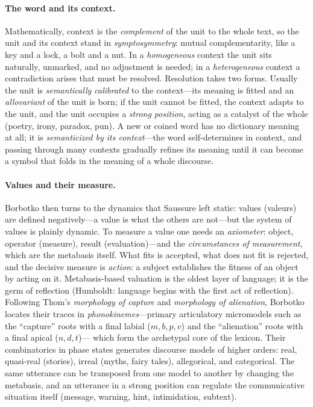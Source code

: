 \documentclass[11pt,a4paper]{article}
\theoremstyle{remark}
\begin{document}
\paragraph{The word and its context.}
Mathematically, context is the \emph{complement} of the unit to the whole
text, so the unit and its context stand in \emph{symptosymmetry}: mutual
complementarity, like a key and a lock, a bolt and a nut. In a
\emph{homogeneous} context the unit sits naturally, unmarked, and no
adjustment is needed; in a \emph{heterogeneous} context a contradiction arises
that must be resolved. Resolution takes two forms. Usually the unit is
\emph{semantically calibrated} to the context---its meaning is fitted and an
\emph{allovariant} of the unit is born; if the unit cannot be fitted, the
context adapts to the unit, and the unit occupies a \emph{strong position},
acting as a catalyst of the whole (poetry, irony, paradox, pun). A new or
coined word has no dictionary meaning at all; it is \emph{semanticized by its
context}---the word self-determines in context, and passing through many
contexts gradually refines its meaning until it can become a symbol that folds
in the meaning of a whole discourse.

\paragraph{Values and their measure.}
Borbotko then turns to the dynamics that Saussure left static: values
(valeurs) are defined negatively---a value is what the others are not---but the
system of values is plainly dynamic. To measure a value one needs an
\emph{axiometer}: object, operator (measure), result (evaluation)---and the
\emph{circumstances of measurement}, which are the metabasis itself. What fits
is accepted, what does not fit is rejected, and the decisive measure is
\emph{action}: a subject establishes the fitness of an object by acting on it.
Metabasis-based valuation is the oldest layer of language; it is the germ of
reflection (Humboldt: language begins with the first act of reflection).
Following Thom's \emph{morphology of capture} and \emph{morphology of
alienation}, Borbotko locates their traces in \emph{phonokinemes}---primary
articulatory micromodels such as the ``capture'' roots with a final labial
($m, b, p, v$) and the ``alienation'' roots with a final apical ($n, d, t$)---
which form the archetypal core of the lexicon. Their combinatorics in phase
states generates discourse models of higher orders: real, quasi-real
(stories), irreal (myths, fairy tales), allegorical, and categorical. The same
utterance can be transposed from one model to another by changing the
metabasis, and an utterance in a strong position can regulate the communicative
situation itself (message, warning, hint, intimidation, subtext).
\end{document}
